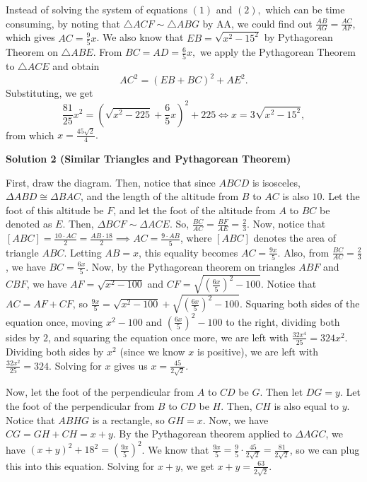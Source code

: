 \begin{enumerate}
 Instead of solving the system of equations $(1)$ and $(2),$ which can be time consuming, by noting that $\triangle ACF \sim \triangle ABG$ by AA, we could find out $\frac{AB}{AG} = \frac{AC}{AF}$, which gives $AC = \frac{9}{5}x$. We also know that $EB = \sqrt{x^2 - 15^2}$ by Pythagorean Theorem on $\triangle ABE$. From $BC = AD = \frac{6}{5}x,$ we apply the Pythagorean Theorem to $\triangle ACE$ and obtain
 \[AC^2 = (EB+BC)^2 + AE^2.\]Substituting, we get
 \[\frac{81}{25}x^2 = \left(\sqrt{x^2 -225}+\frac{6}{5}x\right)^2+225 \iff x = 3\sqrt{x^2 - 15^2},\]from which $x = \frac{45\sqrt{2}}{4}.$




\textbf{Solution 2 (Similar Triangles and Pythagorean Theorem)}

First, draw the diagram. Then, notice that since $ABCD$ is isosceles, $\Delta ABD \cong \Delta BAC$, and the length of the altitude from $B$ to $AC$ is also $10$. Let the foot of this altitude be $F$, and let the foot of the altitude from $A$ to $BC$ be denoted as $E$. Then, $\Delta BCF \sim \Delta ACE$. So, $\frac{BC}{AC} = \frac{BF}{AE} = \frac{2}{3}$. Now, notice that $[ABC] = \frac{10 \cdot AC} {2} = \frac{AB \cdot 18}{2} \implies AC = \frac{9 \cdot AB}{5}$, where $[ABC]$ denotes the area of triangle $ABC$. Letting $AB = x$, this equality becomes $AC = \frac{9x}{5}$. Also, from $\frac{BC}{AC} = \frac{2}{3}$, we have $BC = \frac{6x}{5}$. Now, by the Pythagorean theorem on triangles $ABF$ and $CBF$, we have $AF = \sqrt{x^{2}-100}$ and $CF = \sqrt{ \left( \frac{6x}{5} \right) ^{2}-100}$. Notice that $AC = AF + CF$, so $\frac{9x}{5} = \sqrt{x^{2}-100} + \sqrt{ \left( \frac{6x}{5} \right) ^{2}-100}$. Squaring both sides of the equation once, moving $x^{2}-100$ and $\left( \frac{6x}{5} \right) ^{2}-100$ to the right, dividing both sides by $2$, and squaring the equation once more, we are left with $\frac{32x^{4}}{25} = 324x^{2}$. Dividing both sides by $x^{2}$ (since we know $x$ is positive), we are left with $\frac{32x^{2}}{25} = 324$. Solving for $x$ gives us $x = \frac{45}{2\sqrt{2}}$. 

 Now, let the foot of the perpendicular from $A$ to $CD$ be $G$. Then let $DG = y$. Let the foot of the perpendicular from $B$ to $CD$ be $H$. Then, $CH$ is also equal to $y$. Notice that $ABHG$ is a rectangle, so $GH = x$. Now, we have $CG = GH + CH = x + y$. By the Pythagorean theorem applied to $\Delta AGC$, we have $(x+y)^{2}+18^{2}= \left( \frac{9x}{5} \right) ^{2}$. We know that $\frac{9x}{5} = \frac{9}{5} \cdot \frac{45}{2\sqrt{2}} = \frac{81}{2\sqrt{2}}$, so we can plug this into this equation. Solving for $x+y$, we get $x+y=\frac{63}{2\sqrt{2}}$. 


\end{enumerate}
